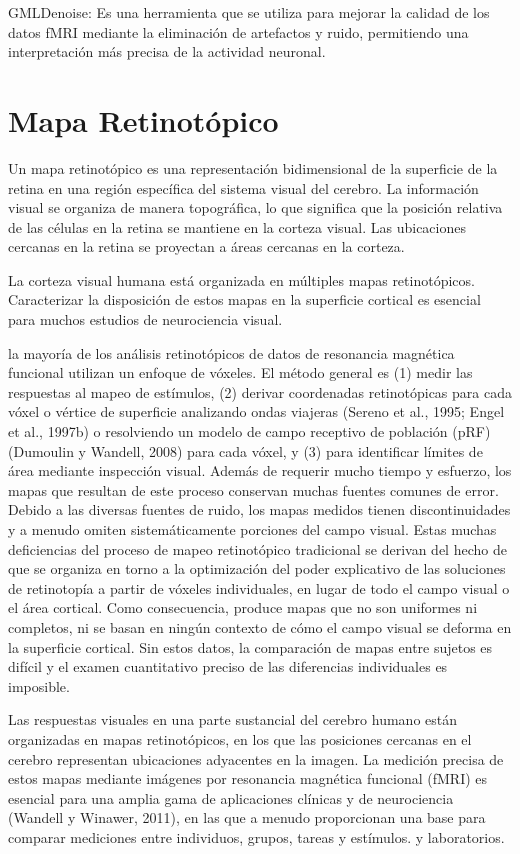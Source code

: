 GMLDenoise: Es una herramienta que se utiliza para mejorar la calidad de los datos fMRI mediante la eliminación de artefactos y ruido, permitiendo una interpretación más precisa de la actividad neuronal.

\section{Mapa Retinot\'opico}

Un mapa retinotópico es una representación bidimensional de la superficie de la retina en una región específica del sistema visual del cerebro. La información visual se organiza de manera topográfica, lo que significa que la posición relativa de las células en la retina se mantiene en la corteza visual. Las ubicaciones cercanas en la retina se proyectan a áreas cercanas en la corteza.

La corteza visual humana está organizada en múltiples mapas retinotópicos. Caracterizar la disposición de estos mapas en la superficie cortical es esencial para muchos estudios de neurociencia visual.

la mayoría de los análisis retinotópicos de datos de resonancia magnética funcional utilizan un enfoque de vóxeles. El método general es (1) medir las respuestas al mapeo de estímulos, (2) derivar coordenadas retinotópicas para cada vóxel o vértice de superficie analizando ondas viajeras (Sereno et al., 1995; Engel et al., 1997b) o resolviendo un modelo de campo receptivo de población (pRF) (Dumoulin y Wandell, 2008) para cada vóxel, y (3) para identificar límites de área mediante inspección visual. Además de requerir mucho tiempo y esfuerzo, los mapas que resultan de este proceso conservan muchas fuentes comunes de error. Debido a las diversas fuentes de ruido, los mapas medidos tienen discontinuidades y a menudo omiten sistemáticamente porciones del campo visual. Estas muchas deficiencias del proceso de mapeo retinotópico tradicional se derivan del hecho de que se organiza en torno a la optimización del poder explicativo de las soluciones de retinotopía a partir de vóxeles individuales, en lugar de todo el campo visual o el área cortical. Como consecuencia, produce mapas que no son uniformes ni completos, ni se basan en ningún contexto de cómo el campo visual se deforma en la superficie cortical. Sin estos datos, la comparación de mapas entre sujetos es difícil y el examen cuantitativo preciso de las diferencias individuales es imposible.

Las respuestas visuales en una parte sustancial del cerebro humano están organizadas en mapas retinotópicos, en los que las posiciones cercanas en el cerebro representan ubicaciones adyacentes en la imagen. La medición precisa de estos mapas mediante imágenes por resonancia magnética funcional (fMRI) es esencial para una amplia gama de aplicaciones clínicas y de neurociencia (Wandell y Winawer, 2011), en las que a menudo proporcionan una base para comparar mediciones entre individuos, grupos, tareas y estímulos. y laboratorios. 

